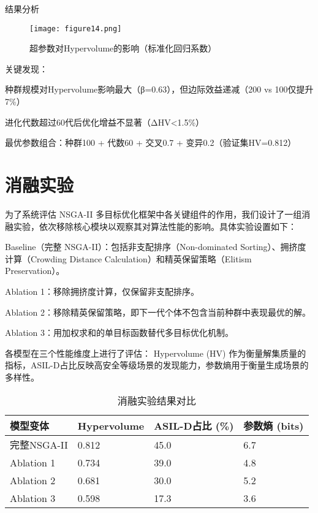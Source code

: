 结果分析

\begin{figure}[htbp]
	\centering
	\texttt{[image: figure14.png]}
	\caption{超参数对Hypervolume的影响（标准化回归系数）}
	\label{fig:hyperparam}
\end{figure}

关键发现：

种群规模对Hypervolume影响最大（β=0.63），但边际效益递减（200 vs 100仅提升7\%）

进化代数超过60代后优化增益不显著（ΔHV<1.5\%）

最优参数组合：种群100 + 代数60 + 交叉0.7 + 变异0.2（验证集HV=0.812）


\section{消融实验}

为了系统评估 NSGA-II 多目标优化框架中各关键组件的作用，我们设计了一组消融实验，依次移除核心模块以观察其对算法性能的影响。具体实验设置如下：

Baseline（完整 NSGA-II）：包括非支配排序（Non-dominated Sorting）、拥挤度计算（Crowding Distance Calculation）和精英保留策略（Elitism Preservation）。

Ablation 1：移除拥挤度计算，仅保留非支配排序。

Ablation 2：移除精英保留策略，即下一代个体不包含当前种群中表现最优的解。

Ablation 3：用加权求和的单目标函数替代多目标优化机制。

各模型在三个性能维度上进行了评估：
Hypervolume (HV) 作为衡量解集质量的指标，ASIL-D占比反映高安全等级场景的发现能力，参数熵用于衡量生成场景的多样性。

\begin{table}[htbp]
	\centering
	\caption{消融实验结果对比}
	\begin{tabular}{llll}
		\hline
		模型变体 & Hypervolume & ASIL-D占比 (\%) & 参数熵 (bits) \\
		\hline
		完整NSGA-II & 0.812 & 45.0 & 6.7 \\
		\hline
		Ablation 1 & 0.734 & 39.0 & 4.8 \\
		\hline
		Ablation 2 & 0.681 & 30.0 & 5.2 \\
		\hline
		Ablation 3 & 0.598 & 17.3 & 3.6 \\
		\hline
	\end{tabular}
\end{table}

